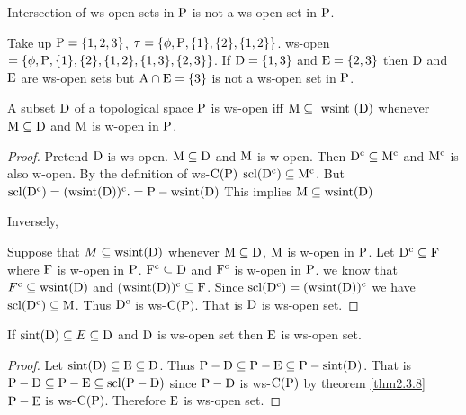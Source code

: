 \begin{rem}\label{rem2.3.4}
Intersection of ws-open sets in $\mathrm{P}$ is not a ws-open set in $\mathrm{P}$.
\end{rem}

\begin{exm}\label{exam2.3.5}
Take up $\mathrm{P} = \{1,2, 3\}$, $\tau = \{\phi, \mathrm{P}, \{1\}, \{2\}, \{1, 2\}\}$. ws-open $= \{\phi, \mathrm{P}, \{1\}, \{2\}, \{1, 2\},\{1,3\},\{2,3\}\}$. If $\mathrm{D}= \{1,3\}$ and $\mathrm{E}=\{2,3\}$ then $\mathrm{D}$ and $\mathrm{E}$ are ws-open sets but $\mathrm{A}\cap \mathrm{E}=\{3\}$ is not a ws-open set in $\mathrm{P}$.
\end{exm}

\begin{thm}\label{thm2.3.6}
A subset $\mathrm{D}$ of a topological space $\mathrm{P}$ is ws-open iff $\TSM\subseteq  \text{ wsint } (\clrD)$ whenever $\mathrm{M}\subseteq \mathrm{D}$ and $\mathrm{M}$ is w-open in $\mathrm{P}$.
\end{thm}

\begin{proof}
Pretend $\mathrm{D}$ is ws-open. $\mathrm{M}\subseteq \mathrm{D}$ and $\mathrm{M}$ is w-open. Then $\mathrm{D}^{\text{c}} \subseteq \mathrm{M}^{\text{c}}$ and $\mathrm{M}^{\text{c}}$ is also w-open. By the definition of ws-$\mathrm{C}(\mathrm{P})$ $\mathrm{scl}(\mathrm{D}^{\text{c}})\subseteq \mathrm{M}^{\text{c}}$. But $\mathrm{scl}(\mathrm{D}^{\text{c}})=(\text{wsint}(\mathrm{D}))^{\text{c}}.=\mathrm{P}-\text{wsint}(\mathrm{D})$ This implies $\TSM\subseteq \text{wsint}(\clrD)$ 

Inversely,

Suppose that $M\subseteq  \mathrm{wsint}(\mathrm{D})$ whenever $\mathrm{M}\subseteq \mathrm{D}$, $\mathrm{M}$ is w-open in $\mathrm{P}$. Let $\mathrm{D}^{\text{c}} \subseteq \mathrm{F}$ where $\mathrm{F}$ is w-open in $\mathrm{P}$. $\mathrm{F}^{\text{c}} \subseteq \mathrm{D}$ and $\mathrm{F}^{\text{c}}$ is w-open in $\mathrm{P}$. we know that $F^{\text{c}} \subseteq \mathrm{wsint}(\mathrm{D})$ and ($\mathrm{wsint}(\mathrm{D}))^{\text{c}} \subseteq \mathrm{F}$. Since $\mathrm{scl}(\mathrm{D}^{\text{c}})= (\mathrm{wsint}(\mathrm{D}))^{\text{c}}$ we have $\mathrm{scl}(\mathrm{D}^{\text{c}})\subseteq \mathrm{M}$. Thus $\mathrm{D}^{\text{c}}$ is ws-$\mathrm{C}(\mathrm{P})$. That is $\mathrm{D}$ is ws-open set.
\end{proof}

\begin{thm}\label{thm2.3.7}
If $\mathrm{sint}(\mathrm{D})\subseteq E\subseteq \mathrm{D}$ and $\mathrm{D}$ is ws-open set then $\mathrm{E}$ is ws-open set.
\end{thm}

\begin{proof}
Let $\mathrm{sint}(\mathrm{D})\subseteq \mathrm{E}\subseteq \mathrm{D}$. Thus $\mathrm{P}-\mathrm{D}\subseteq \mathrm{P}-\mathrm{E}\subseteq \mathrm{P}-\mathrm{sint}(\mathrm{D})$. That is $\mathrm{P}-\mathrm{D}\subseteq \mathrm{P}-\mathrm{E}\subseteq \mathrm{scl}(\mathrm{P}-\mathrm{D})$ since $\mathrm{P}-\mathrm{D}$ is ws-$\mathrm{C}(\mathrm{P})$ by theorem \ref{thm2.3.8} $\mathrm{P}-\mathrm{E}$ is ws-$\mathrm{C}(\mathrm{P})$. Therefore $\mathrm{E}$  is ws-open set.
\end{proof}

